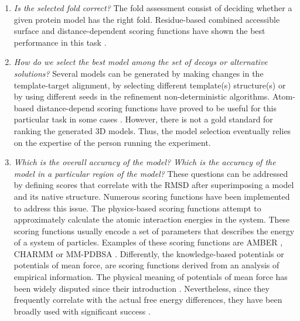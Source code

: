 \documentclass[11pt, b5paper,twoside]{tesi_upf}
\begin{document}
\begin{enumerate}
\begin{enumerate}[label=\roman*]
\item \textit{Is the selected fold correct?} The fold assessment consist of deciding whether a given protein model has the right fold. Residue-based combined accessible surface and distance-dependent scoring functions have shown the best performance in this task \cite{Melo2002}. 
\item \textit{How do we select the best model among the set of decoys or alternative solutions?} Several models can be generated by making changes in the template-target alignment, by selecting different template(s) structure(s) or by using different seeds in the refinement non-deterministic algorithms. Atom-based distance-depend scoring functions have proved to be useful for this particular task in some cases \cite{Samudrala1998}. However, there is not a gold standard for ranking the generated 3D models. Thus, the model selection eventually relies on the expertise of the person running the experiment. 
\item \textit{Which is the overall accuracy of the model? Which is the accuracy of the model in a particular region of the model?} These questions can be addressed by defining scores that correlate with the RMSD after superimposing a model and its native structure. Numerous scoring functions have been implemented to address this issue. The physics-based scoring functions attempt  to  approximately  calculate the  atomic  interaction  energies  in  the  system. These scoring functions usually encode a set of parameters that describes the energy of a system of particles. Examples of these scoring functions are AMBER \cite{CASE2005}, CHARMM \cite{Brooks1983} or MM-PDBSA \cite{Fogolari2003}. Differently, the knowledge-based potentials or potentials of mean force, are scoring functions derived from an analysis of empirical information. The physical meaning of potentials of mean force has been widely disputed since their introduction \cite{Thomas1996}. Nevertheless, since they frequently correlate with the actual free energy differences, they have been broadly used with significant success \cite{Shen2006, Zhou2002, Sippl1995}. 
\end{enumerate}
\end{enumerate}
\end{document}
